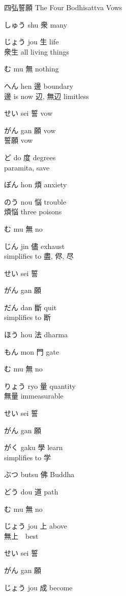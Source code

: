 \documentclass[letterpaper]{article}
\newcommand{\kanji}{\centering\fontsize{70}{70}}
\newcommand{\means}{\tcblower\centering}
\newcommand{\heartblock}[3]
{
	
	
	\begin{kanjibox}{#1}
		\kanji #2
		\means #3
	\end{kanjibox}
	
}
\begin{document}
	
\centering 四弘誓願 The Four Bodhisattva Vows

\begin{multicols}{4}
\RLmulticolcolumns

\heartblock{しゅう shu}{衆}{many}
\heartblock{じょう jou}{生}{life \\ 衆生 all living things}
\heartblock{む mu}{無}{nothing}
\heartblock{へん hen}{邊}{boundary \\ 邊 is now 辺,  無辺 limitless}
\heartblock{せい sei}{誓}{vow}
\heartblock{がん gan}{願}{vow  \\ 誓願 vow}
\heartblock{ど do}{度}{degrees \\ paramita, save}

\heartblock{ぽん hon}{煩}{anxiety}
\heartblock{のう nou}{悩}{trouble \\ 煩悩 three poisons }
\heartblock{む mu}{無}{no}
\heartblock{じん jin}{儘}{exhaust \\ simplifies to 盡,  侭,  尽}
\heartblock{せい sei}{誓}{}
\heartblock{がん gan}{願}{}
\heartblock{だん dan}{斷}{quit \\ simplifies to 断}

\heartblock{ほう hou}{法}{dharma}
\heartblock{もん mon}{門}{gate}
\heartblock{む mu}{無}{no}
\heartblock{りょう ryo}{量}{quantity \\ 無量 immeasurable}
\heartblock{せい sei}{誓}{}
\heartblock{がん gan}{願}{}
\heartblock{がく gaku}{學}{learn \\ simplifies to 学}

\heartblock{ぶつ butsu}{佛}{Buddha}
\heartblock{どう dou}{道}{path}
\heartblock{む mu}{無}{no}
\heartblock{じょう jou}{上}{above \\ 無上　best}
\heartblock{せい sei}{誓}{}
\heartblock{がん gan}{願}{}
\heartblock{じょう jou}{成}{become}

\end{multicols}
\pagebreak


	


\renewcommand{\kanji}{\centering\fontsize{80}{80}}
\end{document}
